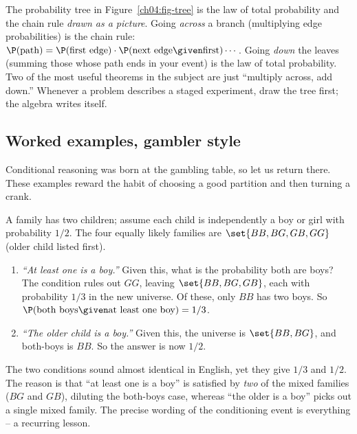 \begin{aestheticbox}
The probability tree in Figure~\ref{ch04:fig-tree} is the law of total probability and the chain rule \emph{drawn as a picture}. Going \emph{across} a branch (multiplying edge probabilities) is the chain rule: $\P(\text{path}) = \P(\text{first edge})\cdot\P(\text{next edge}\given \text{first})\cdots$. Going \emph{down} the leaves (summing those whose path ends in your event) is the law of total probability. Two of the most useful theorems in the subject are just ``multiply across, add down.'' Whenever a problem describes a staged experiment, draw the tree first; the algebra writes itself.
\end{aestheticbox}

\subsection{Worked examples, gambler style}

Conditional reasoning was born at the gambling table, so let us return there. These examples reward the habit of choosing a good partition and then turning a crank.

\begin{example}
\label{ch04:ex-two-children}
A family has two children; assume each child is independently a boy or girl with probability $1/2$. The four equally likely families are $\set{BB, BG, GB, GG}$ (older child listed first).
\begin{enumerate}
\item \emph{``At least one is a boy.''} Given this, what is the probability both are boys? The condition rules out $GG$, leaving $\set{BB, BG, GB}$, each with probability $1/3$ in the new universe. Of these, only $BB$ has two boys. So $\P(\text{both boys}\given \text{at least one boy}) = 1/3$.
\item \emph{``The older child is a boy.''} Given this, the universe is $\set{BB, BG}$, and both-boys is $BB$. So the answer is now $1/2$.
\end{enumerate}
The two conditions sound almost identical in English, yet they give $1/3$ and $1/2$. The reason is that ``at least one is a boy'' is satisfied by \emph{two} of the mixed families ($BG$ and $GB$), diluting the both-boys case, whereas ``the older is a boy'' picks out a single mixed family. The precise wording of the conditioning event is everything -- a recurring lesson.
\end{example}

